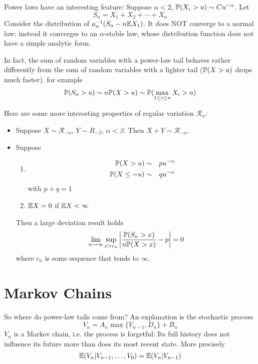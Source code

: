 \documentclass{beamer}
\begin{document}
\begin{frame}
  Power laws have an interesting feature: Suppose $\alpha < 2$,
  $\P(X_i > u) \sim C u^{-\alpha}$. Let
  \[
  S_n = X_1 + X_2 + \cdots + X_n
  \]
  Consider the distribution of $a_n^{-1} (S_n - n \E X_1)$. It 
  does NOT converge to a normal law; instead it converges to an
  $\alpha$-stable law, whose distribution function does not have a
  simple analytic form.
\end{frame}

\begin{frame}
  In fact, the sum of random variables with a power-law tail behaves
  rather differently from the sum of random variables with a lighter
  tail ($\P(X > u)$ drops much faster). for example
  \begin{eqnarray*}
    \P(S_n > u) \sim n \P(X > u) \sim \P(\max_{1 \leq i \leq n} X_i > u)
  \end{eqnarray*}
\end{frame}

\begin{frame}
  Here are some more interesting properties of regular variation
  $\mathcal R_{\alpha}$:
  \begin{itemize}
    \item Suppose $X \sim \mathcal R_{-\alpha}$, $Y \sim R_{-\beta}$,
      $\alpha < \beta$. Then $X + Y \sim \mathcal R_{-\alpha}$.
    \item Suppose
      \begin{enumerate}
      \item
        \begin{eqnarray*}
          \P(X > u) &\sim& p u^{-\alpha} \\
          \P(X \leq -u) &\sim& q u^{-\alpha} \\
        \end{eqnarray*}
        with $p + q = 1$
      \item $\E X = 0$ if $\E X < \infty$
      \end{enumerate}
      Then a large deviation result holds
      \[
      \lim_{n \to \infty} \sup_{x > c_n}
      \left|
          {\P(S_n > x)
            \over
           n\P(X > x)
          } - p
      \right| = 0
      \]
      where $c_n$ is some sequence that tends to $\infty$.
  \end{itemize}
\end{frame}

\section{Markov Chains}
\begin{frame}
  So where do power-law tails come from? An explanation is the
  stochastic process
  \[
  V_n = A_n \max\{V_{n-1}, D_n\} + B_n
  \]
  $V_n$ is a Markov chain, i.e. the process is forgetful: Its full
  history does not influence its future more than does its most recent
  state. More precisely
  \[
  \E(V_n | V_{n-1}, \dots, V_0) = \E (V_n | V_{n-1})
  \]
\end{frame}
\end{document}
